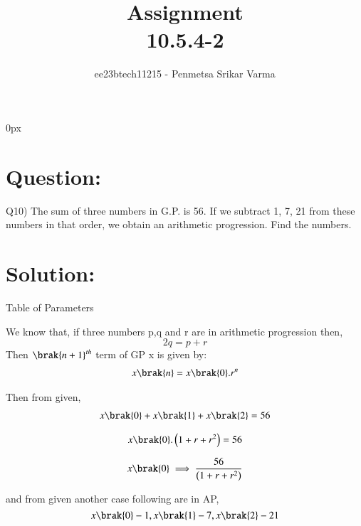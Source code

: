 \documentclass[beamer]{IEEEtran}
\theoremstyle{remark}
\begin{document}
\parindent 0px


\title{Assignment\\[1ex]10.5.4-2}
\author{ee23btech11215 - Penmetsa Srikar Varma$^{}$%
}
\maketitle
\newpage
\bigskip

\renewcommand{\thefigure}{\theenumi}
\renewcommand{\thetable}{\theenumi}
\section*{Question:}
Q10) The sum of three numbers in G.P. is 56. If we subtract 1, 7, 21 from these numbers in that order, we obtain an arithmetic progression. Find the numbers.
\section*{Solution:}
{\centering
Table of Parameters\\
}
\begin{table}[h]
    \centering
     
     \label{tab:t1}
\end{table}
We know that, if three numbers p,q and r are in arithmetic progression then,
\begin{equation}
\label{q1}
2q = p + r
\end{equation}
Then $\brak{n+1}^{th}$ term of GP x is given by:\\

\begin{align}
\label{e1}
x\brak{n}=x\brak{0}.r^{n}
\end{align}

Then from given,
\begin{align}
x\brak{0}+x\brak{1}+x\brak{2}=56
\end{align}

\begin{align}
x\brak{0}.\left(1+r+r^2\right)=56
\end{align}

\begin{equation}
\label{q2}
x\brak{0}\implies\frac{56}{\left(1+r+r^2\right)}
\end{equation}

and from given another case following are in AP,
$$
x\brak{0}-1,x\brak{1}-7,x\brak{2}-21
$$
\end{document}
